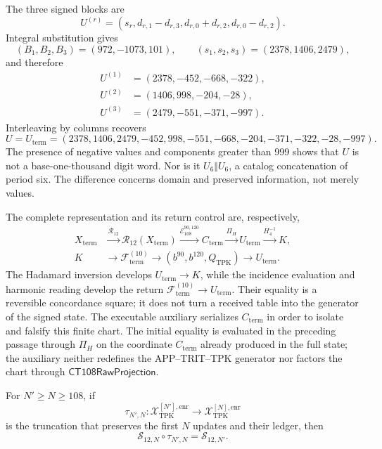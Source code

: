 The three signed blocks are
\begin{equation}
 U^{(r)}=(s_r,d_{r,1}-d_{r,3},d_{r,0}+d_{r,2},d_{r,0}-d_{r,2}).
 \label{eq:k-bloques-firmados}
\end{equation}
Integral substitution gives
\[
 (B_1,B_2,B_3)=(972,-1073,101),\qquad
 (s_1,s_2,s_3)=(2378,1406,2479),
\]
and therefore
\begin{align*}
 U^{(1)}&=(2378,-452,-668,-322),\\
 U^{(2)}&=(1406,998,-204,-28),\\
 U^{(3)}&=(2479,-551,-371,-997).
\end{align*}
Interleaving by columns recovers
\begin{equation}
 U=U_{\mathrm{term}}=(2378,1406,2479,-452,998,-551,
       -668,-204,-371,-322,-28,-997).
 \label{eq:k-u-firmado}
\end{equation}
The presence of negative values and components greater than 999 shows that
\(U\) is not a base-one-thousand digit word. Nor is it
\(U_6\Vert U_6\), a catalog concatenation of period six. The difference
concerns domain and preserved information, not merely values.

The complete representation and its return control are, respectively,
\[
\begin{aligned}
 X_{\mathrm{term}}
 &\xrightarrow{\mathcal R_{12}}
 \mathcal R_{12}(X_{\mathrm{term}})
 \xrightarrow{\mathcal E_{108}^{90,120}}
 C_{\mathrm{term}}
 \xrightarrow{\Pi_H}U_{\mathrm{term}}
 \xrightarrow{H_4^{-1}}K,\\
 K&\longrightarrow\mathscr F_{\mathrm{term}}^{(10)}
 \longrightarrow(b^{90},b^{120},Q_{\mathrm{TPK}})
 \longrightarrow U_{\mathrm{term}}.
\end{aligned}
\]
The Hadamard inversion develops \(U_{\mathrm{term}}\to K\), while the
incidence evaluation and harmonic reading develop the return
\(\mathscr F_{\mathrm{term}}^{(10)}\to U_{\mathrm{term}}\). Their equality is
a reversible concordance square; it does not turn a received table into the
generator of the signed state. The executable auxiliary serializes
\(C_{\mathrm{term}}\) in order to isolate and falsify this finite chart. The
initial equality is evaluated in the preceding passage through \(\Pi_H\) on
the coordinate \(C_{\mathrm{term}}\) already produced in the full state; the
auxiliary neither redefines the APP--TRIT--TPK generator nor factors the chart
through \(\mathsf{CT108RawProjection}\).

\begin{theorem}
\label{thm:k-naturalidad-lector-firmado}
For \(N'\geq N\geq108\), if
\[
 \tau_{N',N}:
 \mathcal X_{\mathrm{TPK}}^{[N'],\mathrm{enr}}
 \longrightarrow
 \mathcal X_{\mathrm{TPK}}^{[N],\mathrm{enr}}
\]
is the truncation that preserves the first \(N\) updates and their ledger,
then
\[
 \mathcal S_{12,N}\circ\tau_{N',N}
 =\mathcal S_{12,N'}.
\]
\end{theorem}

